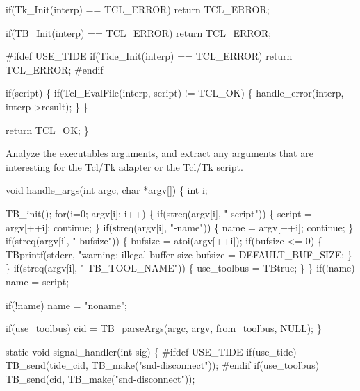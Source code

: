   if(Tk_Init(interp) == TCL_ERROR)
    return TCL_ERROR;

  if(TB_Init(interp) == TCL_ERROR)
    return TCL_ERROR;

#ifdef USE_TIDE
  if(Tide_Init(interp) == TCL_ERROR)
    return TCL_ERROR;
#endif

  if(script) \{
    if(Tcl_EvalFile(interp, script) != TCL_OK) \{
      handle_error(interp, interp->result);
    \}
  \}

  return TCL_OK;
\}
\nwendcode{}\nwdocspar


Analyze the executables arguments, and extract any arguments
that are interesting for the Tcl/Tk adapter or the Tcl/Tk script.

\nwenddocs{}\endmoddef\let\nwnotused=\nwoutput{}
void handle_args(int argc, char *argv[])
\{
  int i;

  TB_init();
  for(i=0; argv[i]; i++) \{
    if(streq(argv[i], "-script")) \{
      script = argv[++i];
      continue;
    \}
    if(streq(argv[i], "-name")) \{
      name = argv[++i];
      continue;
    \}
    if(streq(argv[i], "-bufsize")) \{
      bufsize = atoi(argv[++i]);
      if(bufsize <= 0) \{
        TBprintf(stderr, "warning: illegal buffer size %
        bufsize = DEFAULT_BUF_SIZE;
      \}
    \}
    if(streq(argv[i], "-TB_TOOL_NAME")) \{
      use_toolbus = TBtrue;
    \}
  \}
  if(!name)
    name = script;

  if(!name)
    name = "noname";

  if(use_toolbus)
    cid = TB_parseArgs(argc, argv, from_toolbus, NULL);
\}
\nwendcode{}\nwdocspar


\nwenddocs{}\endmoddef\let\nwnotused=\nwoutput{}
static void signal_handler(int sig)
\{
#ifdef USE_TIDE
  if(use_tide)
    TB_send(tide_cid, TB_make("snd-disconnect"));
#endif
  if(use_toolbus)
    TB_send(cid, TB_make("snd-disconnect"));

